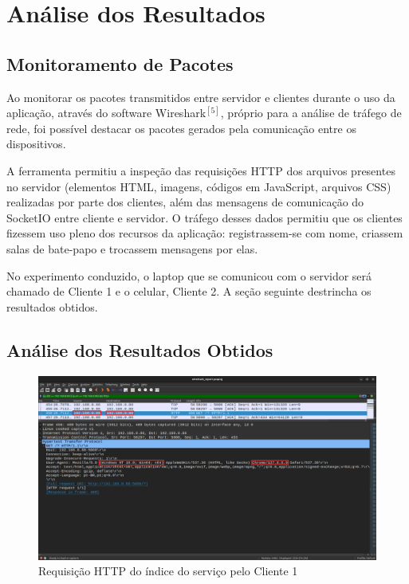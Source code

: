\documentclass[conference,compsoc]{IEEEtran}
\begin{document}
\begin{otherlanguage}{brazil}
\section{Análise dos Resultados}

\subsection{Monitoramento de Pacotes}

Ao monitorar os pacotes transmitidos entre servidor e clientes durante o uso da aplicação, através do software Wireshark$^{[5]}$, próprio para a análise de tráfego de rede, foi possível destacar os pacotes gerados pela comunicação entre os dispositivos.

A ferramenta permitiu a inspeção das requisições HTTP dos arquivos presentes no servidor (elementos HTML, imagens, códigos em JavaScript, arquivos CSS) realizadas por parte dos clientes, além das mensagens de comunicação do SocketIO entre cliente e servidor. O tráfego desses dados permitiu que os clientes fizessem uso pleno dos recursos da aplicação: registrassem-se com nome, criassem salas de bate-papo e trocassem mensagens por elas.

No experimento conduzido, o laptop que se comunicou com o servidor será chamado de Cliente 1 e o celular, Cliente 2. A seção seguinte destrincha os resultados obtidos.

\subsection{Análise dos Resultados Obtidos}


\begin{figure}[!h]
\centering
\includegraphics[width=\columnwidth]{../media/00-client0_app.png}
\caption{Requisição HTTP do índice do serviço pelo Cliente 1}
\label{fig:client1_request}
\end{figure}


\end{otherlanguage}
\end{document}
